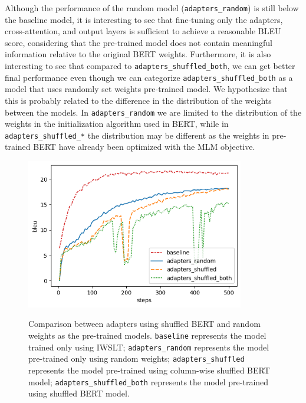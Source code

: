 Although the performance of the random model (\texttt{adapters\_random}) is still below the baseline model, it is interesting to see that fine-tuning only the adapters, cross-attention, and output layers is sufficient to achieve a reasonable BLEU score, considering that the pre-trained model does not contain meaningful information relative to the original BERT weights. Furthermore, it is also interesting to see that compared to \texttt{adapters\_shuffled\_both}, we can get better final performance even though we can categorize \texttt{adapters\_shuffled\_both} as a model that uses randomly set weights pre-trained model. We hypothesize that this is probably related to the difference in the distribution of the weights between the models. In \texttt{adapters\_random} we are limited to the distribution of the weights in the initialization algorithm used in BERT, while in \texttt{adapters\_shuffled\_*} the distribution may be different as the weights in pre-trained BERT have already been optimized with the MLM objective.

\begin{figure}[h]
    {\includegraphics[width=0.85\textwidth]{img/randomshuffled.png}}
    \centering
    \caption[Comparison between adapters using shuffled BERT and random weights as the pre-trained models.]{Comparison between adapters using shuffled BERT and random weights as the pre-trained models. \texttt{baseline} represents the model trained only using IWSLT; \texttt{adapters\_random} represents the model pre-trained only using random weights; \texttt{adapters\_shuffled} represents the model pre-trained using column-wise shuffled BERT model; \texttt{adapters\_shuffled\_both} represents the model pre-trained using shuffled BERT model.}
    \label{img:shfrndcmp}
\end{figure}

